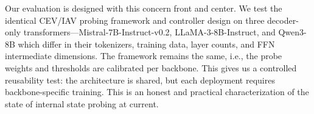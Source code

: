 Our evaluation is designed with this concern front and center. We test the identical CEV/IAV probing framework and controller design on three decoder-only transformers—Mistral-7B-Instruct-v0.2, LLaMA-3-8B-Instruct, and Qwen3-8B which differ in their tokenizers, training data, layer counts, and FFN intermediate dimensions. The framework remains the same, i.e., the probe weights and thresholds are calibrated per backbone. This gives us a controlled reusability test: the architecture is shared, but each deployment requires backbone-specific training. This is an honest and practical characterization of the state of internal state probing at current.